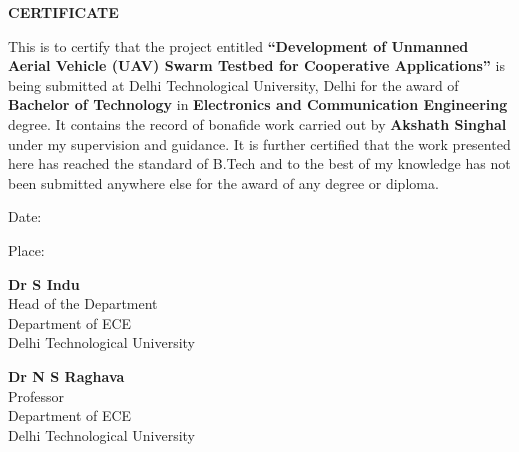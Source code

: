 \begin{spacing}{2}
\begin{center}
\fontsize{24pt}{24pt}\selectfont \textbf{CERTIFICATE\\}
\vspace*{1cm}
\end{center}
\fontsize{14pt}{14pt}\selectfont
This is to certify that the project entitled \textbf{“Development of Unmanned Aerial Vehicle (UAV) Swarm Testbed for Cooperative Applications”} is being submitted at Delhi Technological University, Delhi for the award of \textbf{Bachelor of Technology} in \textbf{Electronics and Communication Engineering} degree. It contains the record of bonafide work carried out by \textbf{Akshath Singhal} under my supervision and guidance. It is further certified that the work presented here has reached the standard of B.Tech and to the best of my knowledge has not been submitted anywhere else for the award of any degree or diploma.

\vspace{0.8cm}
Date:

Place:

\vspace{1.5cm}
\end{spacing}
\begin{spacing}{1.5}
\fontsize{14pt}{14pt}\selectfont
\begin{multicols}{2}
\noindent \textbf{Dr S Indu}\\Head of the Department\\Department of ECE\\ Delhi Technological University
 \begin{flushright}
\noindent \textbf{Dr N S Raghava}\\Professor\\Department of ECE\\ Delhi Technological University
\end{flushright}
\end{multicols}
\end{spacing}

